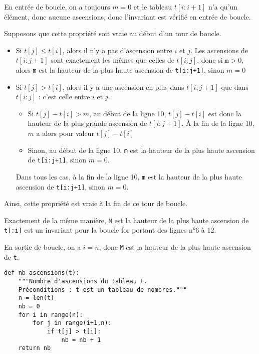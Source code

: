 \exer{}
\setcounter{numques}{0}

\question{} En entrée de boucle, on a toujours $m=0$ et le tableau $t[i:i+1]$ n'a qu'un élément, donc aucune ascensions, donc l'invariant est vérifié en entrée de boucle. 

Supposons que cette propriété soit vraie au début d'un tour de boucle. 
\begin{itemize}
  \item Si $t[j]  \leq t[i]$, alors il n'y a pas d'ascension entre $i$ et $j$. Les ascensions de $t[i:j+1]$ sont exactement les mêmes que celles de $t[i:j]$, donc si $\texttt{m}>0$, alors \texttt{m} est la hauteur de la plus haute ascension de \texttt{t[i:j+1]}, sinon $m=0$ 
  \item Si $t[j]  > t[i]$, alors il y a une ascension en plus dans $t[i:j+1]$ que dans $t[i:j]$ : c'est celle entre $i$ et $j$. 
    \begin{itemize}
      \item[\textbullet] Si $t[j]-t[i] > m$, au début de la ligne 10, $t[j]-t[i]$ est donc la hauteur de la plus grande ascension de $t[i:j+1]$. À la fin de la ligne 10, $m$ a alors pour valeur  $t[j]-t[i]$
      \item[\textbullet] Sinon, au début de la ligne 10, \texttt{m} est la hauteur de la plus haute ascension de \texttt{t[i:j+1]}, sinon $m=0$.
    \end{itemize}
    Dans tous les cas, à la fin de la ligne 10, \texttt{m} est la hauteur de la plus haute ascension de \texttt{t[i:j+1]}, sinon $m=0$.
\end{itemize}
Ainsi, cette propriété est vraie à la fin de ce tour de boucle. 



\question{}
Exactement de la même manière, \og \texttt{M} est la hauteur de la plus haute ascension de \texttt{t[:i]} \fg{} est un invariant pour la boucle  for portant des lignes n°6 à 12.

En sortie de boucle, on a $i = n$, donc \texttt{M} est la hauteur de la plus haute ascension de \texttt{t}.



\question{}
\begin{lstlisting}
def nb_ascensions(t):
    """Nombre d'ascensions du tableau t.
    Préconditions : t est un tableau de nombres."""
    n = len(t)
    nb = 0
    for i in range(n):
        for j in range(i+1,n):
            if t[j] > t[i]:
                nb = nb + 1
    return nb
\end{lstlisting}
